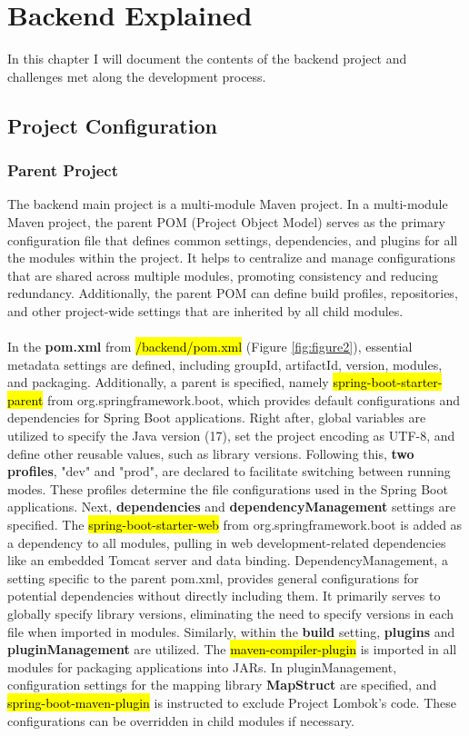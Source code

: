 \chapter{Backend Explained} \label{Backend Explained}

In this chapter I will document the contents of the backend project and challenges met along the development process.

\section{Project Configuration}

\subsection{Parent Project}

\noindent The backend main project is a multi-module Maven project. 
In a multi-module Maven project, the parent POM (Project Object Model) serves as the primary configuration file that defines common settings, dependencies, and plugins for all the modules within the project. It helps to centralize and manage configurations that are shared across multiple modules, promoting consistency and reducing redundancy. Additionally, the parent POM can define build profiles, repositories, and other project-wide settings that are inherited by all child modules.
\\\\
\noindent In the \textbf{pom.xml} from \hl{/backend/pom.xml} (Figure \ref{fig:figure2}), essential metadata settings are defined, including groupId, artifactId, version, modules, and packaging. Additionally, a parent is specified, namely \hl{spring-boot-starter-parent} from org.springframework.boot, which provides default configurations and dependencies for Spring Boot applications. Right after, global variables are utilized to specify the Java version (17), set the project encoding as UTF-8, and define other reusable values, such as library versions. Following this, \textbf{two profiles}, "dev" and "prod", are declared to facilitate switching between running modes. These profiles determine the file configurations used in the Spring Boot applications. Next, \textbf{dependencies} and \textbf{dependencyManagement} settings are specified. The \hl{spring-boot-starter-web} from org.springframework.boot is added as a dependency to all modules, pulling in web development-related dependencies like an embedded Tomcat server and data binding. DependencyManagement, a setting specific to the parent pom.xml, provides general configurations for potential dependencies without directly including them. It primarily serves to globally specify library versions, eliminating the need to specify versions in each file when imported in modules. Similarly, within the \textbf{build} setting, \textbf{plugins} and \textbf{pluginManagement} are utilized. The \hl{maven-compiler-plugin} is imported in all modules for packaging applications into JARs. In pluginManagement, configuration settings for the mapping library \textbf{MapStruct} are specified, and \hl{spring-boot-maven-plugin} is instructed to exclude Project Lombok's code. These configurations can be overridden in child modules if necessary.

